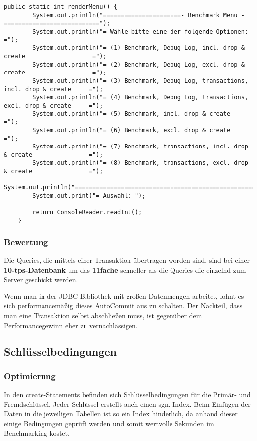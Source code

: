 \begin{lstlisting}[caption={Renderer für das Konsolen Menü}]
	public static int renderMenu() {
		System.out.println("======================- Benchmark Menu -===========================");
		System.out.println("= Wähle bitte eine der folgende Optionen:                         =");
		System.out.println("= (1) Benchmark, Debug Log, incl. drop & create                   =");
		System.out.println("= (2) Benchmark, Debug Log, excl. drop & create                   =");
		System.out.println("= (3) Benchmark, Debug Log, transactions, incl. drop & create     =");
		System.out.println("= (4) Benchmark, Debug Log, transactions, excl. drop & create     =");
		System.out.println("= (5) Benchmark, incl. drop & create                              =");
		System.out.println("= (6) Benchmark, excl. drop & create                              =");
		System.out.println("= (7) Benchmark, transactions, incl. drop & create                =");
		System.out.println("= (8) Benchmark, transactions, excl. drop & create                =");
		System.out.println("===================================================================");
		System.out.print("= Auswahl: ");
		
		return ConsoleReader.readInt();
	}
\end{lstlisting}

\subsubsection*{Bewertung}
Die Queries, die mittels einer Transaktion übertragen worden sind, sind bei
einer \textbf{10-tps-Datenbank} um \ca das \textbf{11fache} schneller als die
Queries die einzelnd zum Server geschickt werden. 

Wenn man in der JDBC Bibliothek mit großen Datenmengen arbeitet, lohnt es sich
performancemäßig dieses AutoCommit aus zu schalten. Der Nachteil, dass man eine
Transaktion selbst abschließen muss, ist gegenüber dem Performancegewinn eher zu
vernachlässigen.
\clearpage


\subsection{Schlüsselbedingungen}
\subsubsection*{Optimierung}
In den create-Statements befinden sich Schlüsselbedingungen für die Primär- und
Fremdschlüssel. Jeder Schlüssel erstellt auch einen sgn. Index. Beim Einfügen
der Daten in die jeweiligen Tabellen ist so ein Index hinderlich, da anhand
dieser einige Bedingungen geprüft werden und somit wertvolle Sekunden im
Benchmarking kostet.

